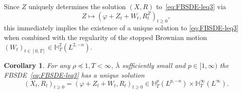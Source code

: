\documentclass[11pt, a4paper]{scrartcl}
\numberwithin{equation}{section}
\theoremstyle{plain}
\newtheorem{corollary}[foo]{Corollary}
\theoremstyle{remark}
\begin{document}
Since $Z$ uniquely determines the solution $(X, R)$ to~\eqref{eq:FBSDE-leq3}
via
\[ Z \mapsto (\varphi + Z_t + W_t, R^Z_t)_{t \geqslant 0}, \]
this immediately implies the existence of a unique solution to
\eqref{eq:FBSDE-leq3} when combined with the regularity of the stopped
Brownian motion $(W_t)_{t \in [0, T]} \in \mathbb{H}^2_T (L^{2, - n})$.

\begin{corollary}
  \label{cor:well-posedness}For any $\rho \preceq  1, T < \infty$, $\bar{\lambda}$ sufficiently small and $p \in
  [1, \infty)$ the FBSDE~\eqref{eq:FBSDE-leq3} has a unique solution
  \[ (X_t, R_t)_{t \geqslant 0} = (\varphi + Z_t + W_t, R_t)_{t \geqslant 0}
     \in \mathbb{H}^p_T (L^{p, - n}) \times \mathbb{H}^{\infty}_T (L^{\infty})
     . \]
\end{corollary}
\end{document}
